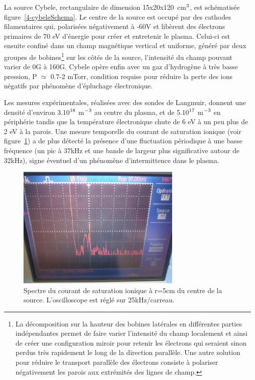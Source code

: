 \begin{refsection}
La source Cybele, rectangulaire de dimension 
15x20x120~cm$^{{3}}$, est schématisée 
figure~\ref{4-cybeleSchema}. Le centre de la source est
occupé par des cathodes filamentaires qui, polarisées négativement à -60V et
libèrent des électrons primaires de 70 eV
d'énergie pour créer et entretenir le plasma.
Celui-ci est ensuite confiné dans un champ magnétique vertical et uniforme, généré par deux
groupes de bobines\footnote{La décomposition sur la hauteur des bobines
latérales en différentes parties indépendantes permet de faire varier l'intensité du champ
localement et ainsi de créer une configuration miroir pour retenir les
électrons qui seraient sinon perdus très rapidement le long de la direction
parallèle. Une autre solution pour réduire le transport parallèle des électrons
consiste à polariser négativement les parois aux extrémités des lignes de
champ.} sur les côtés de la source, l'intensité du champ pouvant varier de 0G à
160G. Cybele opère enfin avec un gaz d'hydrogène à très basse pression,
P $\simeq$ 0.7-2 mTorr, condition requise pour réduire la perte des ions
négatifs par phénomène d'épluchage électronique.

Les mesures expérimentales, réalisées avec des sondes de Langmuir, donnent une
densité d'environ 3.10$^{{18}}$ m$^{{-3}}$ au centre du plasma, et
de 5.10$^{{17}}$ m$^{{-3}}$ en périphérie tandis que la
température électronique chute de 6 eV à un peu plus de 2 eV à la parois. Une mesure
temporelle du courant de saturation ionique (voir
figure~\ref{4-CybeleFourierSignal}) a de plus détecté la
présence d'une fluctuation périodique à une basse fréquence (un pic à
37kHz et une bande de largeur plus significative autour de 32kHz), signe
éventuel d'un phénomène d'intermittence dans le plasma.

\begin{figure}[!htbp]
  \centering
    \includegraphics[height=6cm]{figures/4-CybeleFourierSignal.jpg}
    \caption{Spectre du courant de saturation
    ionique à r=5cm du centre de la source.
    L'oscilloscope est réglé sur 25kHz/carreau.\label{4-CybeleFourierSignal}}
\end{figure}


\end{refsection}
